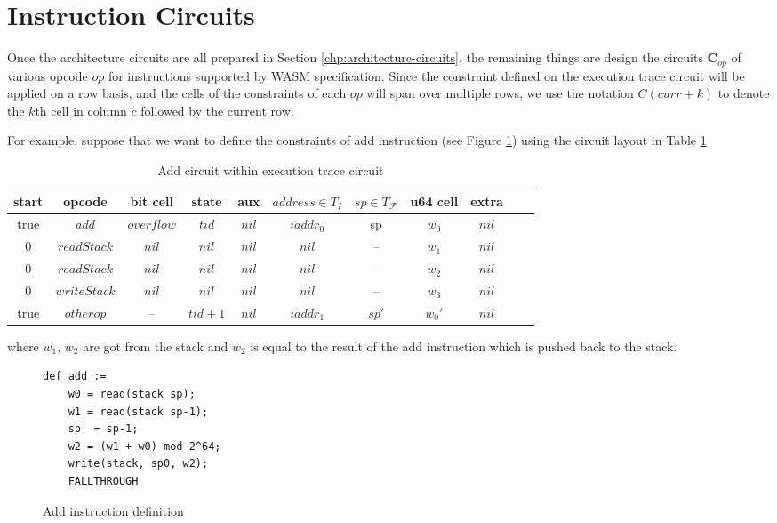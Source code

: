 \section{Instruction Circuits}
\label{chp:instruction-circuits}
Once the architecture circuits are all prepared in Section \ref{chp:architecture-circuits}, the remaining things are design the circuits $\mathbf{C}_{op}$ of various opcode $op$ for instructions supported by WASM specification. Since the constraint defined on the execution trace circuit will be applied on a row basis, and the cells of the constraints of each $op$ will span over multiple rows, we use the notation $C(curr+k)$ to denote the $k$th cell in column $c$ followed by the current row.

For example, suppose that we want to define the constraints of add instruction (see Figure \ref{fig:example-ins}) using the circuit layout in Table \ref{tbl:add-instruction}
\begin{table}[!h]
\begin{center}
\caption{Add circuit within execution trace circuit}
\label{tbl:add-instruction}
\begin{tabular}{ | c | c | c | c | c | c | c | c | c | c | c | }
  \hline
  start & opcode & bit cell & state & aux & $address \in T_{I}$ & $sp \in T_\mathcal{F}$& u64 cell & extra \\ 
  \hline
   true & $add$ & $overflow$ & $tid$ & $nil$ & $iaddr_0$ & sp & $w_0$ & $nil$\\ 
 \hline
   0 & $readStack$ & $nil$ & $nil$ & $nil$ & $nil$ & -- & $w_1$ & $nil$\\ 
 \hline
   0 & $readStack$ & $nil$ & $nil$ & $nil$ & $nil$ & -- & $w_2$ & $nil$\\ 
 \hline
   0 & $writeStack$ & $nil$ & $nil$ & $nil$ & $nil$ & -- & $w_3$ & $nil$\\ 
 \hline
   true & $otherop$ & -- & $tid+1$ & $nil$ & $iaddr_1$ & $sp'$ & $w_0'$ & $nil$\\
 \hline
\end{tabular}

\end{center}
\end{table}
where $w_1$, $w_2$ are got from the stack and $w_2$ is equal to the result of the add instruction which is pushed back to the stack.
\begin{figure}
\small
\centering
\begin{verbatim}
def add :=
    w0 = read(stack sp);
    w1 = read(stack sp-1);
    sp' = sp-1;
    w2 = (w1 + w0) mod 2^64;
    write(stack, sp0, w2);
    FALLTHROUGH
\end{verbatim}
\caption{Add instruction definition}
\label{fig:example-ins}
\end{figure}
